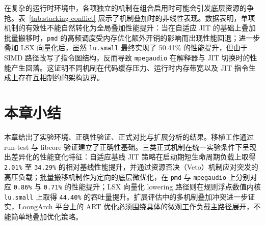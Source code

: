 在复杂的运行时环境中，各项独立的机制在组合启用时可能会引发底层资源的争抢。表~\ref{tab:stacking-conflict} 展示了机制叠加时的非线性表现。数据表明，单项机制的有效性不能自然转化为全局叠加性能提升：当在自适应 JIT 的基础上叠加批量搬移时，\texttt{pmd} 的高频调度受内存优化额外开销的影响而出现性能回退；进一步叠加 LSX 向量化后，虽然 \texttt{lu.small} 最终实现了 50.41\% 的性能提升，但由于 SIMD 路径改写了指令图结构，反而导致 \texttt{mpegaudio} 在解释器与 JIT 切换时的性能产生回落。这证明不同机制在代码缓存压力、运行时内存带宽以及 JIT 指令生成上存在互相制约的架构边界。

\section{本章小结}

本章给出了实验环境、正确性验证、正式对比与扩展分析的结果。移植工作通过 run-test 与 libcore 验证建立了正确性基础。三类正式机制在统一实验条件下呈现出差异化的性能变化特征：自适应基线 JIT 策略在启动期短生命周期负载上取得 \texttt{2.01\%} 至 \texttt{34.29\%} 的相对基线性能提升，并通过资源否决（Veto）机制应对突发的高压负载；批量搬移机制作为定向的底层微优化，在 \texttt{pmd} 与 \texttt{mpegaudio} 上分别对应 \texttt{0.86\%} 与 \texttt{0.71\%} 的性能提升；LSX 向量化 lowering 路径则在规则浮点数值内核 \texttt{lu.small} 上取得 \texttt{44.40\%} 的吞吐量提升。扩展评估中的多机制叠加冲突进一步证实，LoongArch 平台上的 ART 优化必须围绕具体的微观工作负载主路径展开，不能简单地叠加优化策略。
